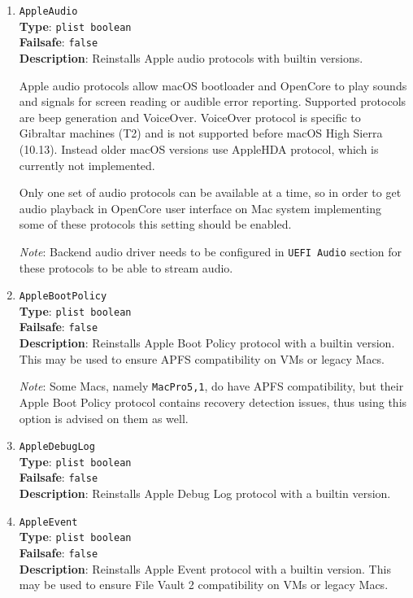 \documentclass[]{article}
\begin{document}
\begin{enumerate}

\item
  \texttt{AppleAudio}\\
  \textbf{Type}: \texttt{plist\ boolean}\\
  \textbf{Failsafe}: \texttt{false}\\
  \textbf{Description}: Reinstalls Apple audio protocols with builtin
  versions.

  Apple audio protocols allow macOS bootloader and OpenCore to play
  sounds and signals for screen reading or audible error reporting.
  Supported protocols are beep generation and VoiceOver. VoiceOver protocol
  is specific to Gibraltar machines (T2) and is not supported before
  macOS High Sierra (10.13). Instead older macOS versions use AppleHDA protocol,
  which is currently not implemented.

  Only one set of audio protocols can be available at a time, so in order
  to get audio playback in OpenCore user interface on Mac system implementing some
  of these protocols this setting should be enabled.

  \emph{Note}: Backend audio driver needs to be configured in \texttt{UEFI Audio}
  section for these protocols to be able to stream audio.

\item
  \texttt{AppleBootPolicy}\\
  \textbf{Type}: \texttt{plist\ boolean}\\
  \textbf{Failsafe}: \texttt{false}\\
  \textbf{Description}: Reinstalls Apple Boot Policy protocol with a builtin
  version. This may be used to ensure APFS compatibility on VMs or legacy Macs.

  \emph{Note}: Some Macs, namely \texttt{MacPro5,1}, do have APFS compatibility,
  but their Apple Boot Policy protocol contains recovery detection issues, thus
  using this option is advised on them as well.

\item
  \texttt{AppleDebugLog}\\
  \textbf{Type}: \texttt{plist\ boolean}\\
  \textbf{Failsafe}: \texttt{false}\\
  \textbf{Description}: Reinstalls Apple Debug Log protocol with a builtin
  version.

\item
  \texttt{AppleEvent}\\
  \textbf{Type}: \texttt{plist\ boolean}\\
  \textbf{Failsafe}: \texttt{false}\\
  \textbf{Description}: Reinstalls Apple Event protocol with a builtin
  version. This may be used to ensure File Vault 2 compatibility on VMs or legacy Macs.


\end{enumerate}
\end{document}
